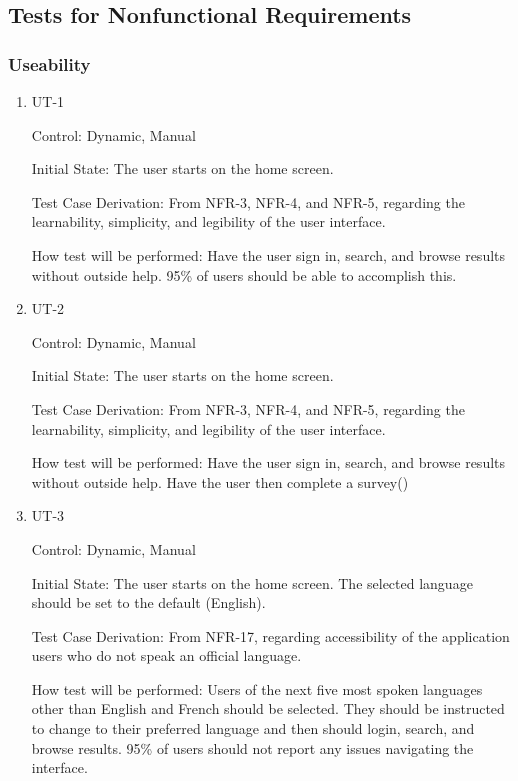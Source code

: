 \documentclass[12pt, titlepage]{article}
\begin{document}
\subsection{Tests for Nonfunctional Requirements}

\subsubsection{Useability}
\label{sec:useabilityNFRtests}

\begin{enumerate}

\item{UT-1}

Control: Dynamic, Manual
					
Initial State: The user starts on the home screen.

Test Case Derivation: From NFR-3, NFR-4, and NFR-5, regarding the learnability, simplicity, and legibility of the user interface.

How test will be performed: Have the user sign in, search, and browse results without outside help. 95\% of users should be able to accomplish this.


\item{UT-2}

Control: Dynamic, Manual
					
Initial State: The user starts on the home screen.

Test Case Derivation: From NFR-3, NFR-4, and NFR-5, regarding the learnability, simplicity, and legibility of the user interface.

How test will be performed: Have the user sign in, search, and browse results without outside help. 
Have the user then complete a survey()

\item{UT-3}

Control: Dynamic, Manual
					
Initial State: The user starts on the home screen. The selected language should be set to the default (English).

Test Case Derivation: From NFR-17, regarding accessibility of the application users who do not speak an official language.

How test will be performed: Users of the next five most spoken languages other than English and French should be selected. They should be instructed to change to their preferred language and then should login, search, and browse results. 95\% of users should not report any issues navigating the interface.


\end{enumerate}
\end{document}
